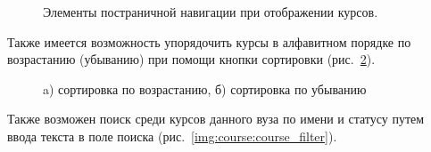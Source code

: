 \begin{figure}[H]
	\caption{Элементы постраничной навигации при отображении курсов.}
	\label{img:course:course_pagination}
\end{figure}

Также имеется возможность упорядочить курсы в алфавитном порядке по возрастанию (убыванию) при помощи кнопки сортировки (рис.~\ref{img:course:course_filter_btn}).

\begin{figure}[H]
	\begin{minipage}[h]{0.49\linewidth}
	\end{minipage}
	\hfill
	\begin{minipage}[h]{0.49\linewidth}
	\end{minipage}
	\caption{a) сортировка по возрастанию, б) сортировка по убыванию}
	\label{img:course:course_filter_btn}
\end{figure}

Также возможен поиск среди курсов данного вуза по имени и статусу путем ввода текста в поле поиска  (рис.~\ref{img:course:course_filter}).

